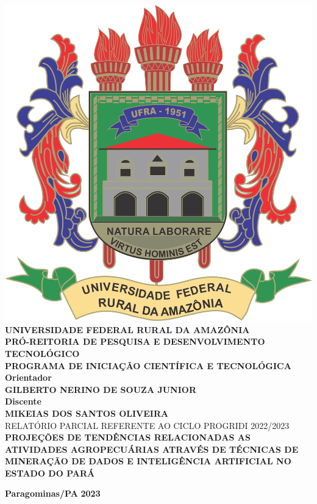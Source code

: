\thispagestyle{empty}
    \begin{center}
        
        \includegraphics[scale=0.1]{src/Brasão_ufra.png}\\
        \vspace{0.25cm}
        \textbf{UNIVERSIDADE FEDERAL RURAL DA AMAZÔNIA}\\
        \textbf{PRÓ-REITORIA DE PESQUISA E DESENVOLVIMENTO TECNOLÓGICO}\\
        \textbf{PROGRAMA DE INICIAÇÃO CIENTÍFICA E TECNOLÓGICA}\\
        \vspace{3cm}
         \textbf{Orientador \\ GILBERTO NERINO DE SOUZA JUNIOR}\\
        \vspace{0.5cm}
        \textbf{Discente \\ MIKEIAS DOS SANTOS OLIVEIRA}\\
        \vspace{1cm}
        RELATÓRIO PARCIAL REFERENTE AO CICLO PROGRIDI 2022/2023\\
        \vspace{5cm}
        \textbf{PROJEÇÕES DE TENDÊNCIAS RELACIONADAS AS ATIVIDADES AGROPECUÁRIAS ATRAVÉS DE TÉCNICAS DE MINERAÇÃO DE DADOS E INTELIGÊNCIA ARTIFICIAL NO ESTADO DO PARÁ}\\
        \vspace{5cm}

        \vspace{2cm}
        \textbf{Paragominas/PA}
        \textbf{2023}\\

  
    \end{center}
